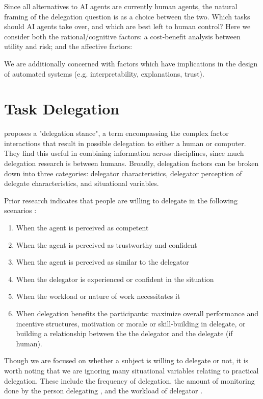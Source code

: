 \documentclass[letterpaper]{article} %
\begin{document}
Since all alternatives to AI agents are currently human agents, the natural framing of the delegation question is as a choice between the two. Which tasks should AI agents take over, and which are best left to human control? Here we consider both the rational/cognitive factors: a cost-benefit analysis between utility and risk; and the affective factors: 

We are additionally concerned with factors which have implications in the design of automated systems (e.g. interpretability, explanations, trust).

\section{Task Delegation}

\cite{milewski1} proposes a "delegation stance", a term encompassing the complex factor interactions that result in possible delegation to either a human or computer. They find this useful in combining information across disciplines, since much delegation research is between humans. Broadly, delegation factors can be broken down into three categories: delegator characteristics, delegator perception of delegate characteristics, and situational variables.

Prior research indicates that people are willing to delegate in the following scenarios \cite{milewski1}: 
\begin{enumerate}
    \item When the agent is perceived as competent
    \item When the agent is perceived as trustworthy and confident
    \item When the agent is perceived as similar to the delegator
    \item When the delegator is experienced or confident in the situation
    \item When the workload or nature of work necessitates it
    \item When delegation benefits the participants: maximize overall performance and incentive structures, motivation or morale or skill-building in delegate, or building a relationship between the the delegator and the delegate (if human).
\end{enumerate}

Though we are focused on whether a subject is willing to delegate or not, it is worth noting that we are ignoring many situational variables relating to practical delegation. These include the frequency of delegation, the amount of monitoring done by the person delegating \cite{milewski1}, and the workload of delegator \cite{leana1986predictors}.
\end{document}
